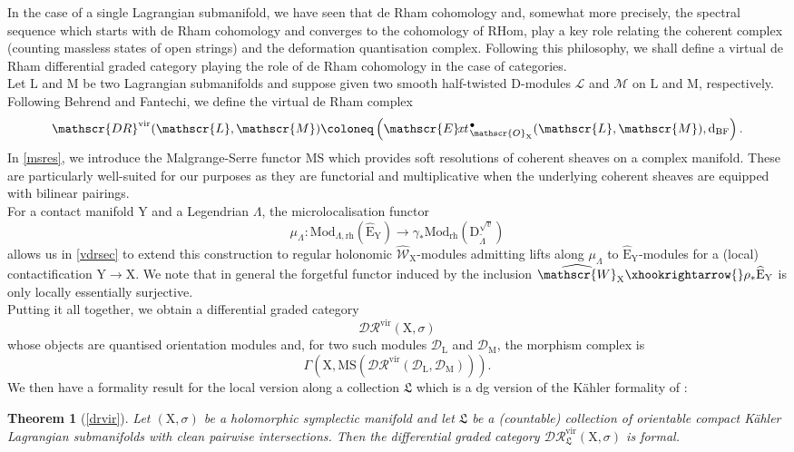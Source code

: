 \documentclass{article}
\theoremstyle{plain}
\newtheorem{theorem}{Theorem}[subsection]   %
\theoremstyle{definition}
\theoremstyle{remark}
\newcommand{\mr}{\mathrm}
\newcommand{\Ww}{\widehat{\mathscr{W}}_{\mr{X}}}
\newcommand{\3}{\vspace{3mm}}
\newcommand{\2}{\vspace{2mm}}
\newcommand{\1}{\vspace{1mm}}
\newcommand*{\ext}{\mathscr{E}\text{\kern -1.5pt {\it{xt}}}\,}
\begin{document}
In the case of a single Lagrangian submanifold, we have seen that de Rham cohomology and, somewhat more precisely, the spectral sequence which starts with de Rham cohomology and converges to the cohomology of $\mr{RHom}$, play a key role relating the coherent complex (counting massless states of open strings) and the deformation quantisation complex. Following this philosophy, we shall define a virtual de Rham differential graded category playing the role of de Rham cohomology in the case of categories.\\
Let $\mr{L}$ and $\mr{M}$ be two Lagrangian submanifolds and suppose given two smooth half-twisted $\mr{D}$-modules $\mathscr{L}$ and $\mathscr{M}$ on $\mr{L}$ and $\mr{M}$, respectively. Following Behrend and Fantechi, we define the virtual de Rham complex $$\mathscr{DR}^{\mr{vir}}(\mathscr{L},\mathscr{M})\coloneq \left(\ext^{\bullet}_{\mathscr{O}_\mr{X}}(\mathscr{L},\mathscr{M}),\mr{d}_\mr{BF}\right).$$
 In \cref{msres}, we introduce the Malgrange-Serre functor $\mr{MS}$ which provides soft resolutions of coherent sheaves on a complex manifold. These are particularly well-suited for our purposes as they are functorial and multiplicative when the underlying coherent sheaves are equipped with bilinear pairings.\\
For a contact manifold $\mr{Y}$ and a Legendrian $\Lambda$, the microlocalisation functor $$\mu_{\Lambda}:\mr{Mod}_{\Lambda,\mr{rh}}\left(\widehat{\mr{E}}_\mr{Y}\right)\to \gamma_*\mr{Mod}_\mr{rh}\left(\mr{D}_{\tilde{\Lambda}}^{\sqrt{v}}\right)$$ allows us in \cref{vdrsec} to extend this construction to regular holonomic $\widehat{\mathscr{W}}_\mr{X}$-modules admitting lifts along $\mu_{\Lambda}$ to $\widehat{\mr{E}}_{\mr{Y}}$-modules for a (local) contactification $\mr{Y}\to \mr{X}$. We note that in general the forgetful functor induced by the inclusion $\Ww\xhookrightarrow{} \rho_*\widehat{\mr{E}}_\mr{Y}$ is only locally essentially surjective. \\
Putting it all together, we obtain a differential graded category $$\mathcal{DR}^{\mr{vir}}(\mr{X},\sigma)$$ whose objects are quantised orientation modules and, for two such modules $\mathscr{D}_\mr{L}$ and $\mathscr{D}_\mr{M}$, the morphism complex is $$\Gamma\left(\mr{X},\mr{MS}\left(\mathscr{DR}^\mr{vir}\left(\mathscr{D}_\mr{L},\mathscr{D}_\mr{M}\right)\right)\right).$$
We then have a formality result for the local version along a collection $\mathfrak{L}$ which is a dg version of the K\"{a}hler formality of \cite{Deligne1975} :
\2
\begin{theorem}[\cref{drvir}]\label{main3}
Let $(\mr{X},\sigma)$ be a holomorphic symplectic manifold and let $\mathfrak{L}$ be a (countable) collection of orientable compact K\"{a}hler  Lagrangian submanifolds with clean pairwise intersections. Then the differential graded category $\mathcal{DR}^\mr{vir}_\mathfrak{L}(\mr{X},\sigma)$ is formal.
\end{theorem}
\end{document}
